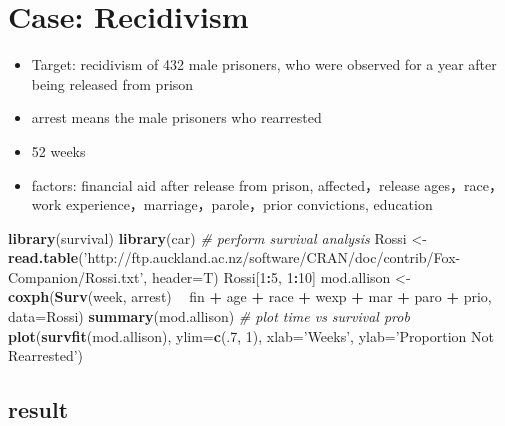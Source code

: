 \documentclass[]{book}
\newenvironment{Shaded}{\begin{snugshade}}{\end{snugshade}}
\newcommand{\CommentTok}[1]{\textcolor[rgb]{0.56,0.35,0.01}{\textit{#1}}}
\newcommand{\DataTypeTok}[1]{\textcolor[rgb]{0.13,0.29,0.53}{#1}}
\newcommand{\DecValTok}[1]{\textcolor[rgb]{0.00,0.00,0.81}{#1}}
\newcommand{\KeywordTok}[1]{\textcolor[rgb]{0.13,0.29,0.53}{\textbf{#1}}}
\newcommand{\NormalTok}[1]{#1}
\newcommand{\OperatorTok}[1]{\textcolor[rgb]{0.81,0.36,0.00}{\textbf{#1}}}
\newcommand{\StringTok}[1]{\textcolor[rgb]{0.31,0.60,0.02}{#1}}
\providecommand{\tightlist}{%
  \setlength{\itemsep}{0pt}\setlength{\parskip}{0pt}}
\begin{document}
\hypertarget{case-recidivism}{%
\section{Case: Recidivism}\label{case-recidivism}}

\begin{itemize}
\tightlist
\item
  Target: recidivism of 432 male prisoners, who were observed for a year after being released from prison
\item
  arrest means the male prisoners who rearrested
\item
  52 weeks
\item
  factors: financial aid after release from prison, affected，release ages，race，work experience，marriage，parole，prior convictions, education
\end{itemize}

\begin{Shaded}
\begin{Highlighting}[]
\KeywordTok{library}\NormalTok{(survival)}
\KeywordTok{library}\NormalTok{(car)}
\CommentTok{# perform survival analysis}
\NormalTok{Rossi <-}\StringTok{ }\KeywordTok{read.table}\NormalTok{(}\StringTok{'http://ftp.auckland.ac.nz/software/CRAN/doc/contrib/Fox-Companion/Rossi.txt'}\NormalTok{, }\DataTypeTok{header=}\NormalTok{T)}
\NormalTok{Rossi[}\DecValTok{1}\OperatorTok{:}\DecValTok{5}\NormalTok{, }\DecValTok{1}\OperatorTok{:}\DecValTok{10}\NormalTok{]}
\NormalTok{mod.allison <-}\StringTok{ }\KeywordTok{coxph}\NormalTok{(}\KeywordTok{Surv}\NormalTok{(week, arrest) }\OperatorTok{~}\StringTok{ }\NormalTok{fin }\OperatorTok{+}\StringTok{ }\NormalTok{age }\OperatorTok{+}\StringTok{ }\NormalTok{race }\OperatorTok{+}\StringTok{ }\NormalTok{wexp }\OperatorTok{+}\StringTok{ }\NormalTok{mar }\OperatorTok{+}\StringTok{ }\NormalTok{paro }\OperatorTok{+}\StringTok{ }\NormalTok{prio, }\DataTypeTok{data=}\NormalTok{Rossi)}
\KeywordTok{summary}\NormalTok{(mod.allison)}
\CommentTok{# plot time vs survival prob}
\KeywordTok{plot}\NormalTok{(}\KeywordTok{survfit}\NormalTok{(mod.allison), }\DataTypeTok{ylim=}\KeywordTok{c}\NormalTok{(.}\DecValTok{7}\NormalTok{, }\DecValTok{1}\NormalTok{), }\DataTypeTok{xlab=}\StringTok{'Weeks'}\NormalTok{, }\DataTypeTok{ylab=}\StringTok{'Proportion Not Rearrested'}\NormalTok{)}
\end{Highlighting}
\end{Shaded}

\hypertarget{result}{%
\subsection{result}\label{result}}
\end{document}
